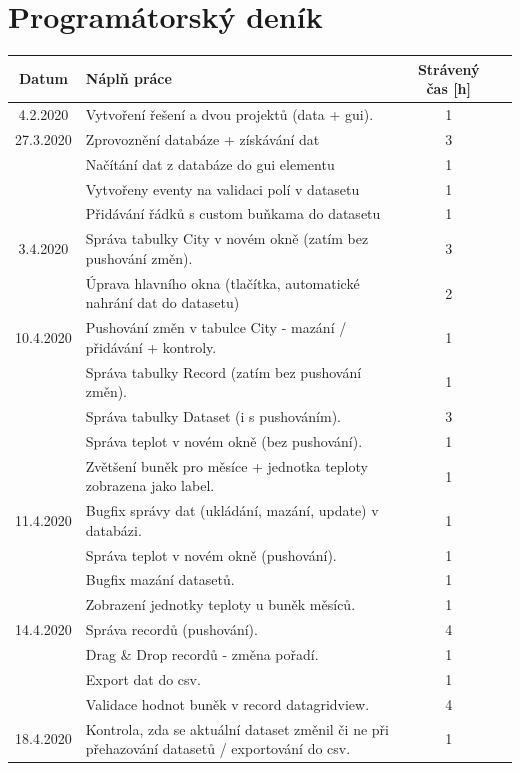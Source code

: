 \documentclass[12pt, a4paper]{article}
\begin{document}
\section{Programátorský deník}
\begin{table}[h!]
  \begin{center}

\begin{tabular}{| cp{10cm} |c | c |}
\hline
  \textbf{Datum} & \textbf{Náplň práce} & \textbf{Strávený čas [h]}\\
\hline
4.2.2020 & Vytvoření řešení a dvou projektů (data + gui). & 1\\
\hline
27.3.2020 & Zprovoznění databáze + získávání dat & 3 \\
& Načítání dat z databáze do gui elementu & 1 \\
& Vytvořeny eventy na validaci polí v datasetu & 1 \\
& Přidávání řádků s custom buňkama do datasetu & 1 \\
\hline
3.4.2020 & Správa tabulky City v novém okně (zatím bez pushování změn). & 3 \\
& Úprava hlavního okna (tlačítka, automatické nahrání dat do datasetu) & 2 \\
\hline
10.4.2020 & Pushování změn v tabulce City - mazání / přidávání + kontroly. & 1 \\
& Správa tabulky Record (zatím bez pushování změn). &1 \\
& Správa tabulky Dataset (i s pushováním). & 3 \\
& Správa teplot v novém okně (bez pushování). & 1 \\
& Zvětšení buněk pro měsíce + jednotka teploty zobrazena jako label. & 1 \\
\hline
11.4.2020 & Bugfix správy dat (ukládání, mazání, update) v databázi. & 1 \\
& Správa teplot v novém okně (pushování). & 1 \\
& Bugfix mazání datasetů. & 1 \\
& Zobrazení jednotky teploty u buněk měsíců. & 1 \\
\hline
14.4.2020 & Správa recordů (pushování). & 4 \\
& Drag \& Drop recordů - změna pořadí. & 1 \\
& Export dat do csv. & 1 \\
& Validace hodnot buněk v record datagridview. & 4 \\
\hline
18.4.2020 & Kontrola, zda se aktuální dataset změnil či ne při přehazování datasetů / exportování do csv. & 1 \\

\end{tabular}
\end{center}
\end{table}
\end{document}
